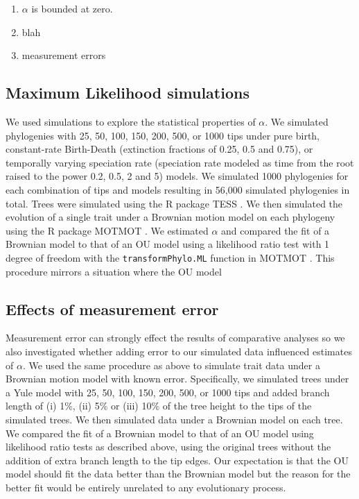 \documentclass[a4paper,12pt]{article}
\begin{document}
    \begin{enumerate}
      \item $\alpha$ is bounded at zero.
      \item blah
      \item measurement errors
    \end{enumerate}

  \subsection{Maximum Likelihood simulations}
  \label{section:sims.methods} 
    We used simulations to explore the statistical properties of $\alpha$. 
    We simulated phylogenies with 25, 50, 100, 150, 200, 500, or 1000 tips under pure birth, constant-rate Birth-Death (extinction fractions of 0.25, 0.5 and 0.75), or temporally varying speciation rate (speciation rate modeled as time from the root raised to the power 0.2, 0.5, 2 and 5) models. 
    We simulated 1000 phylogenies for each combination of tips and models resulting in 56,000 simulated phylogenies in total. 
    Trees were simulated using the R package TESS \cite{hohna2013fast}. 
    We then simulated the evolution of a single trait under a Brownian motion model on each phylogeny using the R package MOTMOT \citep{Thomas:2011aa}. 
    We estimated $\alpha$ and compared the fit of a Brownian model to that of an OU model using a likelihood ratio test with 1 degree of freedom with the \texttt{transformPhylo.ML} function in MOTMOT \citep{Thomas:2011aa}. 
    This procedure mirrors a situation where the OU model  %

  \subsection{Effects of measurement error}
    Measurement error can strongly effect the results of comparative analyses \cite{silvestro2015} so we also investigated whether adding error to our simulated data influenced estimates of $\alpha$.
    We used the same procedure as above to simulate trait data under a Brownian motion model with known error. 
    Specifically, we simulated trees under a Yule model with 25, 50, 100, 150, 200, 500, or 1000 tips and added branch length of (i) 1\%, (ii) 5\% or (iii) 10\% of the tree height to the tips of the simulated trees. 
    We then simulated data under a Brownian model on each tree. 
    We compared the fit of a Brownian model to that of an OU model using likelihood ratio tests as described above, using the original trees without the addition of extra branch length to the tip edges. 
    Our expectation is that the OU model should fit the data better than the Brownian model but the reason for the better fit would be entirely unrelated to any evolutionary process. 
\end{document}
